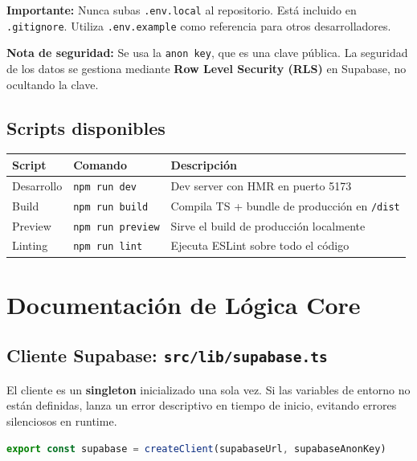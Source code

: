 \documentclass[12pt,letterpaper]{article}
\newcommand{\code}[1]{\texttt{#1}}
\begin{document}
\begin{infobox}
\textbf{Importante:} Nunca subas \code{.env.local} al repositorio. Está incluido en \code{.gitignore}. Utiliza \code{.env.example} como referencia para otros desarrolladores.
\end{infobox}

\begin{infobox}
\textbf{Nota de seguridad:} Se usa la \code{anon key}, que es una clave pública. La seguridad de los datos se gestiona mediante \textbf{Row Level Security (RLS)} en Supabase, no ocultando la clave.
\end{infobox}

\subsection{Scripts disponibles}

\begin{longtable}{p{} p{} p{}}
\toprule
\textbf{Script} & \textbf{Comando} & \textbf{Descripción} \\
\midrule
Desarrollo & \code{npm run dev} & Dev server con HMR en puerto 5173 \\
Build & \code{npm run build} & Compila TS + bundle de producción en \code{/dist} \\
Preview & \code{npm run preview} & Sirve el build de producción localmente \\
Linting & \code{npm run lint} & Ejecuta ESLint sobre todo el código \\
\bottomrule
\end{longtable}

\section{Documentación de Lógica Core}

\subsection{Cliente Supabase: \code{src/lib/supabase.ts}}

El cliente es un \textbf{singleton} inicializado una sola vez. Si las variables de entorno no están definidas, lanza un error descriptivo en tiempo de inicio, evitando errores silenciosos en runtime.

\begin{lstlisting}[language=typescript]
export const supabase = createClient(supabaseUrl, supabaseAnonKey)
\end{lstlisting}
\end{document}
